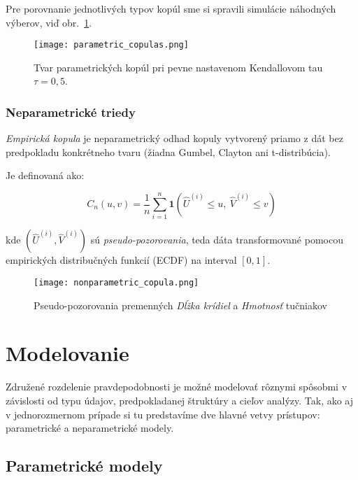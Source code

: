 Pre porovnanie jednotlivých typov kopúl sme si spravili simulácie náhodných výberov, viď obr.~\ref{fig:parametric_copulas}.

\begin{figure}[H]
    \centering
    \texttt{[image: parametric\_copulas.png]}
    \caption{Tvar parametrických kopúl pri pevne nastavenom Kendallovom tau $\tau = 0{,}5$.}
    \label{fig:parametric_copulas}
\end{figure}

\subsubsection{Neparametrické triedy}\label{subsubsec:nonparametric_copula}

\textit{Empirická kopula} je neparametrický odhad kopuly vytvorený priamo z dát bez predpokladu konkrétneho tvaru (žiadna Gumbel, Clayton ani t-distribúcia).

Je definovaná ako:

\begin{equation}
C_n(u, v) = \frac{1}{n} \sum_{i=1}^{n} \mathbf{1}\left( \hat{U}^{(i)} \leq u,\ \hat{V}^{(i)} \leq v \right)
\end{equation}

kde $\left(\hat{U}^{(i)}, \hat{V}^{(i)}\right)$ sú \textit{pseudo-pozorovania}, teda dáta transformované pomocou empirických distribučných funkcií (ECDF) na interval $[0,1]$.

\begin{figure}[H]
    \centering
    \texttt{[image: nonparametric\_copula.png]}
    \caption{Pseudo-pozorovania premenných \textit{Dĺžka krídiel} a \textit{Hmotnosť} tučniakov}
    \label{fig:nonparametric_copula}
\end{figure}

\section{Modelovanie}\label{sec:modelovanie}

Združené rozdelenie pravdepodobnosti je možné modelovať rôznymi spôsobmi v závislosti od typu údajov, predpokladanej štruktúry a cieľov analýzy. Tak, ako aj v jednorozmernom prípade si tu predstavíme dve hlavné vetvy prístupov: parametrické a neparametrické modely.

\subsection{Parametrické modely}\label{subsec:joint_param_models}

